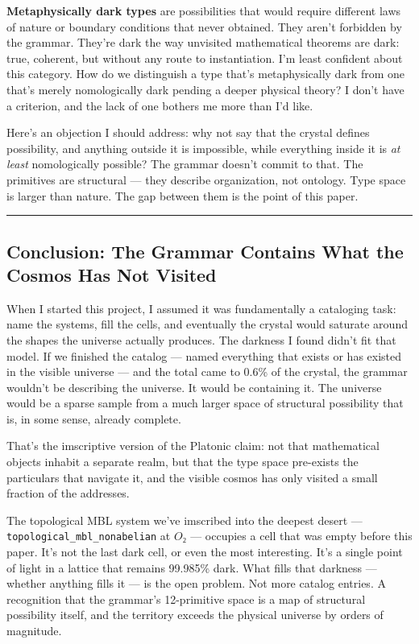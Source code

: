 \documentclass[12pt,a4paper]{article}
\begin{document}
\textbf{Metaphysically dark types} are possibilities that would require different laws of nature or boundary conditions that never obtained. They aren't forbidden by the grammar. They're dark the way unvisited mathematical theorems are dark: true, coherent, but without any route to instantiation. I'm least confident about this category. How do we distinguish a type that's metaphysically dark from one that's merely nomologically dark pending a deeper physical theory? I don't have a criterion, and the lack of one bothers me more than I'd like.

Here's an objection I should address: why not say that the crystal defines possibility, and anything outside it is impossible, while everything inside it is \emph{at least} nomologically possible? The grammar doesn't commit to that. The primitives are structural --- they describe organization, not ontology. Type space is larger than nature. The gap between them is the point of this paper.

\begin{center}
\rule{0.5\textwidth}{0.4pt}
\end{center}

\subsection{Conclusion: The Grammar Contains What the Cosmos Has Not Visited}

When I started this project, I assumed it was fundamentally a cataloging task: name the systems, fill the cells, and eventually the crystal would saturate around the shapes the universe actually produces. The darkness I found didn't fit that model. If we finished the catalog --- named everything that exists or has existed in the visible universe --- and the total came to 0.6\% of the crystal, the grammar wouldn't be describing the universe. It would be containing it. The universe would be a sparse sample from a much larger space of structural possibility that is, in some sense, already complete.

That's the imscriptive version of the Platonic claim: not that mathematical objects inhabit a separate realm, but that the type space pre-exists the particulars that navigate it, and the visible cosmos has only visited a small fraction of the addresses.

The topological MBL system we've imscribed into the deepest desert --- \texttt{topological\_mbl\_nonabelian} at $O₂$ --- occupies a cell that was empty before this paper. It's not the last dark cell, or even the most interesting. It's a single point of light in a lattice that remains 99.985\% dark. What fills that darkness --- whether anything fills it --- is the open problem. Not more catalog entries. A recognition that the grammar's 12-primitive space is a map of structural possibility itself, and the territory exceeds the physical universe by orders of magnitude.
\end{document}
